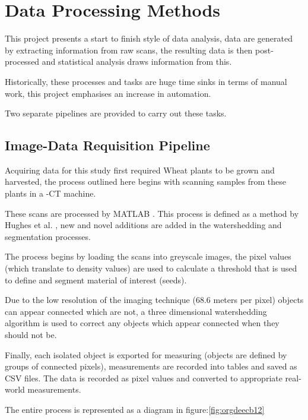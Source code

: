 \documentclass[11pt]{report}
\begin{document}
\section{Data Processing Methods}
\label{sec:org157cd0c}
This project presents a start to finish style of data analysis, data are generated by extracting information from raw scans, the resulting data is then post-processed and statistical analysis draws information from this.

Historically, these processes and tasks are huge time sinks in terms of manual work, this project emphasises an increase in automation.

Two separate pipelines are provided to carry out these tasks.

\subsection{Image-Data Requisition Pipeline}
\label{sec:orgf8c2d35}

Acquiring data for this study first required Wheat plants to be grown and harvested, the process outlined here begins with scanning samples from these plants in a \textmu{}-CT machine.

These scans are processed by MATLAB \cite{MATHWORKS2017}. This process is defined as a method by Hughes et al. \cite{Hughes2017}, new and novel additions are added in the watershedding and segmentation processes.

The process begins by loading the scans into greyscale images, the pixel values (which translate to density values) are used to calculate a threshold that is used to define and segment material of interest (seeds).

Due to the low resolution of the imaging technique (68.6\textmu{} meters per pixel) objects can appear connected which are not, a three dimensional watershedding algorithm is used to correct any objects which appear connected when they should not be.

Finally, each isolated object is exported for measuring (objects are defined by groups of connected pixels), measurements are recorded into tables and saved as CSV files. The data is recorded as pixel values and converted to appropriate real-world measurements.

The entire process is represented as a diagram in figure:\ref{fig:orgdeecb12}
\end{document}
